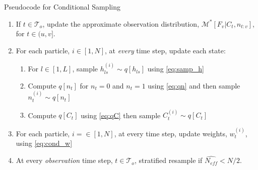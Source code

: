 \begin{table}[h]
\caption{Pseudocode for Conditional Sampling}
\label{tab:back}
\begin{enumerate}
\item If $t \in \mathcal{T}_o$, update the approximate observation distribution, $\mathcal{M}^\ast[F_v | C_t, n_{t:v}]$, for $t \in (u,v]$.
\item For each particle, $i\in[1, N]$, at \emph{every} time step, update each state:
    \begin{enumerate}
    \item For $l\in [1, L]$, sample $h_{ls}^{(i)} \sim q[h_{ls}]$ using \eqref{eq:samp_h}
    \item Compute $q[n_t]$ for $n_t=0$ and $n_t=1$ using \eqref{eq:qn} and then sample $n_t^{(i)} \sim q[n_t]$
    \item Compute $q[C_t]$ using \eqref{eq:qC} then sample $C_t^{(i)} \sim q[C_t]$
    \end{enumerate}
\item For each particle, $i=\in[1,N]$, at every time step, update weights, $w_t^{(i)}$, using \eqref{eq:cond_w}
\item At every \emph{observation} time step, $t \in \mathcal{T}_o$, stratified resample if $\widehat{N_{eff}}<N/2$.
\end{enumerate}
\end{table}

% 
